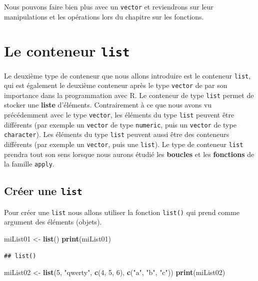 \documentclass[
]{book}
\newenvironment{Shaded}{\begin{snugshade}}{\end{snugshade}}
\newcommand{\DecValTok}[1]{\textcolor[rgb]{0.00,0.00,0.81}{#1}}
\newcommand{\KeywordTok}[1]{\textcolor[rgb]{0.13,0.29,0.53}{\textbf{#1}}}
\newcommand{\NormalTok}[1]{#1}
\newcommand{\StringTok}[1]{\textcolor[rgb]{0.31,0.60,0.02}{#1}}
\begin{document}
Nous pouvons faire bien plus avec un \texttt{vector} et reviendrons sur leur manipulations et les opérations lors du chapitre sur les fonctions.

\hypertarget{l014list}{%
\section{\texorpdfstring{Le conteneur \texttt{list}}{Le conteneur list}}\label{l014list}}

Le deuxième type de conteneur que nous allons introduire est le conteneur \texttt{list}, qui est également le deuxième conteneur après le type \texttt{vector} de par son importance dans la programmation avec R. Le conteneur de type \texttt{list} permet de stocker une \textbf{liste} d'éléments. Contrairement à ce que nous avons vu précédemment avec le type \texttt{vector}, les éléments du type \texttt{list} peuvent être différents (par exemple un \texttt{vector} de type \texttt{numeric}, puis un \texttt{vector} de type \texttt{character}). Les éléments du type \texttt{list} peuvent aussi être des conteneurs différents (par exemple un \texttt{vector}, puis une \texttt{list}). Le type de conteneur \texttt{list} prendra tout son sens lorsque nous aurons étudié les \textbf{boucles} et les \textbf{fonctions} de la famille \texttt{apply}.

\hypertarget{cruxe9er-une-list}{%
\subsection{\texorpdfstring{Créer une \texttt{list}}{Créer une list}}\label{cruxe9er-une-list}}

Pour créer une \texttt{list} nous allons utiliser la fonction \texttt{list()} qui prend comme argument des éléments (objets).

\begin{Shaded}
\begin{Highlighting}[]
\NormalTok{miList01 <-}\StringTok{ }\KeywordTok{list}\NormalTok{()}
\KeywordTok{print}\NormalTok{(miList01)}
\end{Highlighting}
\end{Shaded}

\begin{verbatim}
## list()
\end{verbatim}

\begin{Shaded}
\begin{Highlighting}[]
\NormalTok{miList02 <-}\StringTok{ }\KeywordTok{list}\NormalTok{(}\DecValTok{5}\NormalTok{, }\StringTok{"qwerty"}\NormalTok{, }\KeywordTok{c}\NormalTok{(}\DecValTok{4}\NormalTok{, }\DecValTok{5}\NormalTok{, }\DecValTok{6}\NormalTok{), }\KeywordTok{c}\NormalTok{(}\StringTok{"a"}\NormalTok{, }\StringTok{"b"}\NormalTok{, }\StringTok{"c"}\NormalTok{))}
\KeywordTok{print}\NormalTok{(miList02)}
\end{Highlighting}
\end{Shaded}
\end{document}
